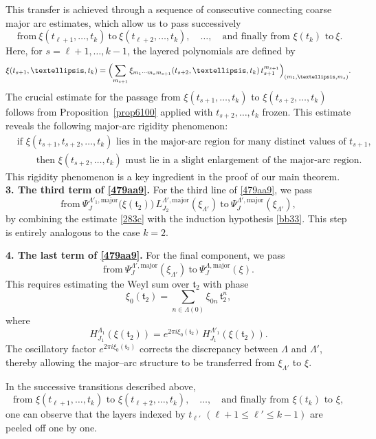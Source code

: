 \documentclass[10pt,a4paper]{amsart}
\numberwithin{equation}{section}
\begin{document}
This transfer is achieved through a sequence of consecutive
connecting coarse major arc  estimates, which allow us to pass successively  
\[\ \text{from}\
\xi(t_{\ell+1},\ldots,t_k)
\ \text{to}\
\xi(t_{\ell+2},\ldots,t_k),
\quad \ldots, \quad
\text{and finally from $\xi(t_k)$ to}\ 
\xi.
\]
Here, for \(s=\ell+1,\ldots,k-1\), the layered polynomials are defined by
\[
\xi(t_{s+1},\ldots,t_k)
=
\Bigl(
\sum_{m_{s+1}}
\xi_{m_1\cdots m_s m_{s+1}}(t_{s+2},\ldots,t_k)\,
t_{s+1}^{m_{s+1}}
\Bigr)_{(m_1,\ldots,m_s)}.
\]
The crucial estimate for the passage from
\(\xi(t_{s+1},\ldots,t_k)\) to \(\xi(t_{s+2},\ldots,t_k)\)
follows from Proposition~\ref{prop6100} applied with
\(t_{s+2},\ldots,t_k\) frozen. This estimate reveals the following major-arc rigidity phenomenon:
\begin{align*}
	&\text{if }\xi(t_{s+1},t_{s+2},\ldots,t_k)\text{ lies in the major-arc region for many distinct values of }t_{s+1},\\
	&\qquad\text{then }\xi(t_{s+2},\ldots,t_k)\text{ must lie in a slight enlargement of the major-arc region.}
\end{align*}This rigidity phenomenon is a key ingredient in the proof of our main theorem.\\
\noindent\textbf{3. The third term of \eqref{479aa9}.}
For the third line of \eqref{479aa9}, we  pass
\[
\text{from}\ 
\Psi_{J}^{\Lambda'_1,\mathrm{major}}\bigl(\xi(\mathfrak{t}_2)\bigr)\,
L^{\Lambda',\mathrm{major}}_{J_2}(\xi_{\Lambda'})
\ \text{to}\ 
\Psi^{\Lambda',\mathrm{major}}_{J}(\xi_{\Lambda'}),
\]
by combining the estimate \eqref{283c} with the induction hypothesis
\eqref{bb33}. This step is entirely analogous to the case \(k=2\).

\medskip
\noindent\textbf{4. The last term of \eqref{479aa9}.}
For the final component, we  pass
\[
\text{from}\ 
\Psi^{\Lambda',\mathrm{major}}_{J}(\xi_{\Lambda'})
\ \text{to}\ 
\Psi^{\Lambda,\mathrm{major}}_{J}(\xi).
\]
This requires estimating the Weyl sum over \(\mathfrak{t}_2\) with phase
\[
\xi_0(\mathfrak{t}_2)
=
\sum_{n\in \Lambda(0)} \xi_{0n}\,\mathfrak{t}_2^n,
\]
where
\[
H^{\Lambda_{1}}_{J_1}\!\left( \xi(\mathfrak{t}_2)\right)
=
e^{2\pi i \xi_0(\mathfrak{t}_2)}
\,H^{\Lambda'_{1}}_{J_1}\!\left( \xi(\mathfrak{t}_2)\right).
\]
The oscillatory factor \(e^{2\pi i \xi_0(\mathfrak{t}_2)}\) corrects the
discrepancy between \(\Lambda\) and \(\Lambda'\), thereby allowing the
major--arc structure to be transferred from \(\xi_{\Lambda'}\) to \(\xi\).

In the successive transitions described above,
\[
\text{from } \xi(t_{\ell+1},\ldots,t_k)
\text{ to } \xi(t_{\ell+2},\ldots,t_k),
\quad \ldots, \quad
\text{and finally from } \xi(t_k) \text{ to } \xi,
\]
one can observe that the layers indexed by \(t_{\ell'}\) \((\ell+1 \le \ell' \le k-1)\)
are peeled off one by one.
\end{document}
